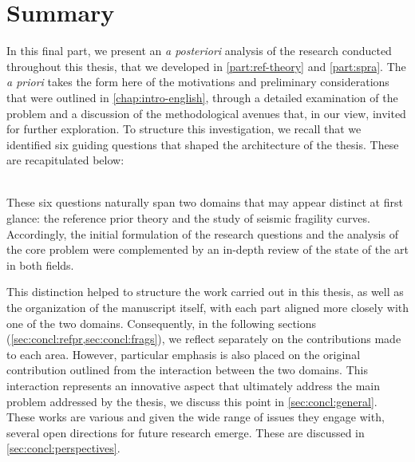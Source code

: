 \section{Summary}




In this final part, we present an \emph{a posteriori} analysis of the research conducted throughout this thesis, that we developed in \cref{part:ref-theory} and \cref{part:spra}. The \emph{a priori} takes the form here of the 
motivations and preliminary considerations that were outlined in \cref{chap:intro-english}, through a detailed examination of the problem and a discussion of the methodological avenues that, in our view, invited for further exploration.
To structure this investigation, we recall that we identified six guiding questions that shaped the architecture of the thesis. These are recapitulated below:\\[-5pt]









\\[1pt]

These six questions naturally span two domains that may appear distinct at first glance: the reference prior theory and the study of seismic fragility curves. Accordingly, the initial formulation of the research questions and the analysis of the core problem were complemented by an in-depth review of the state of the art in both fields.

This distinction helped to structure the work carried out in this thesis, as well as the organization of the manuscript itself, with each part aligned more closely with one of the two domains. Consequently, in the following sections (\cref{sec:concl:refpr,sec:concl:frags}), we reflect separately on the contributions made to each area. However, particular emphasis is also placed on the original contribution outlined from the interaction between the two domains. This interaction represents an innovative aspect that ultimately address the main problem addressed by the thesis, we discuss this point in \cref{sec:concl:general}.
These works are various and given the wide range of issues they engage with, several open directions for future research emerge. These are discussed in \cref{sec:concl:perspectives}.




